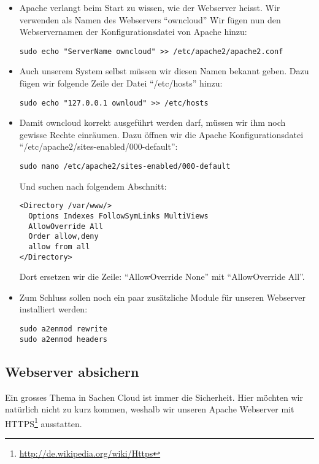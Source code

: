 \begin{itemize}
  \item Apache verlangt beim Start zu wissen, wie der Webserver heisst. Wir verwenden als Namen des Webservers ``owncloud''
  \subitem Wir fügen nun den Webservernamen der Konfigurationsdatei von Apache hinzu:
    \begin{lstlisting}
sudo echo "ServerName owncloud" >> /etc/apache2/apache2.conf
    \end{lstlisting}
  \item Auch unserem System selbst müssen wir diesen Namen bekannt geben. Dazu fügen wir folgende Zeile der Datei ``/etc/hosts'' hinzu:
    \begin{lstlisting}
sudo echo "127.0.0.1 ownloud" >> /etc/hosts
    \end{lstlisting}
  \item Damit owncloud korrekt ausgeführt werden darf, müssen wir ihm noch gewisse Rechte einräumen.
    Dazu öffnen wir die Apache Konfigurationsdatei ``/etc/apache2/sites-enabled/000-default'':
    \begin{lstlisting}
sudo nano /etc/apache2/sites-enabled/000-default
    \end{lstlisting}
    Und suchen nach folgendem Abschnitt:
    \begin{lstlisting}
<Directory /var/www/>
  Options Indexes FollowSymLinks MultiViews
  AllowOverride All
  Order allow,deny
  allow from all
</Directory>
    \end{lstlisting}
    Dort ersetzen wir die Zeile: ``AllowOverride None'' mit ``AllowOverride All''.
  \item Zum Schluss sollen noch ein paar zusätzliche Module für unseren Webserver installiert werden:
    \begin{lstlisting}
sudo a2enmod rewrite
sudo a2enmod headers
    \end{lstlisting}
\end{itemize}

\subsection{Webserver absichern}
Ein grosses Thema in Sachen Cloud ist immer die Sicherheit. Hier möchten wir natürlich nicht zu kurz kommen, weshalb wir unseren Apache Webserver mit HTTPS\footnote{\url{http://de.wikipedia.org/wiki/Https}} ausstatten.

